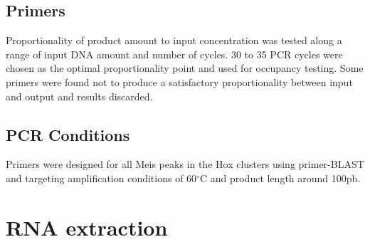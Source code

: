 \subsection{Primers}

Proportionality of product amount to input concentration was tested along a range of input DNA amount and number of cycles. 30 to 35 \ac{PCR} cycles were chosen as the optimal proportionality point and used for occupancy testing. Some primers were found not to produce a satisfactory proportionality between input and output and results discarded. %

\subsection{PCR Conditions}

Primers were designed for all Meis peaks in the Hox clusters using primer-BLAST and targeting amplification conditions of 60$^\circ$C and product length around 100pb. 



\section{RNA extraction}

